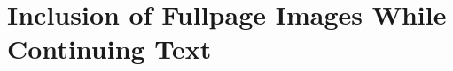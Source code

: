 \documentclass{scrartcl}
\begin{document}
\section{Inclusion of Fullpage Images While Continuing Text}

\Blindtext[2]


\Blindtext[4]
\end{document}
